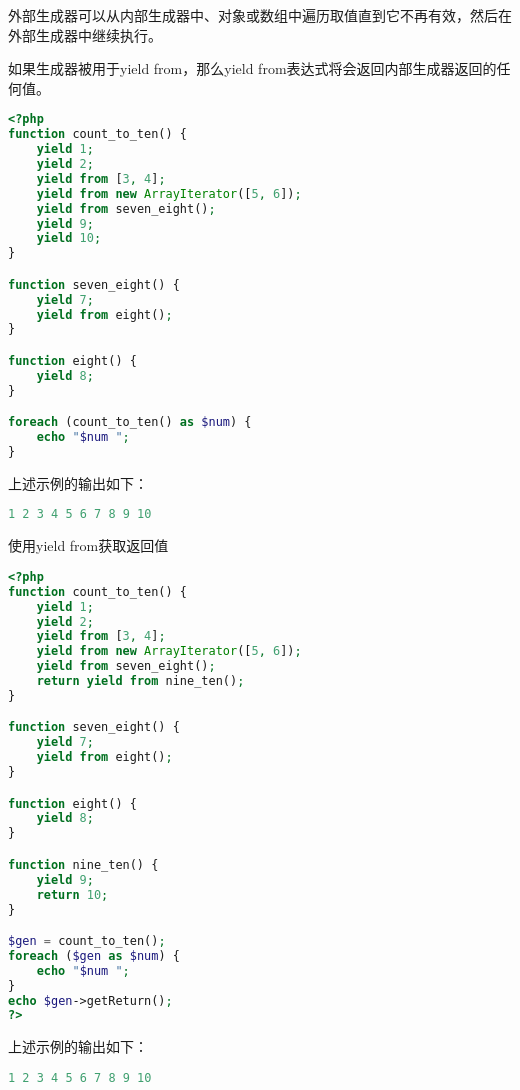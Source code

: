 外部生成器可以从内部生成器中、对象或数组中遍历取值直到它不再有效，然后在外部生成器中继续执行。

如果生成器被用于yield from，那么yield from表达式将会返回内部生成器返回的任何值。


\begin{lstlisting}[language=PHP]
<?php
function count_to_ten() {
    yield 1;
    yield 2;
    yield from [3, 4];
    yield from new ArrayIterator([5, 6]);
    yield from seven_eight();
    yield 9;
    yield 10;
}

function seven_eight() {
    yield 7;
    yield from eight();
}

function eight() {
    yield 8;
}

foreach (count_to_ten() as $num) {
    echo "$num ";
}
\end{lstlisting}

上述示例的输出如下：

\begin{lstlisting}[language=PHP]
1 2 3 4 5 6 7 8 9 10
\end{lstlisting}



\begin{example}
使用yield from获取返回值
\begin{lstlisting}[language=PHP]
<?php
function count_to_ten() {
    yield 1;
    yield 2;
    yield from [3, 4];
    yield from new ArrayIterator([5, 6]);
    yield from seven_eight();
    return yield from nine_ten();
}

function seven_eight() {
    yield 7;
    yield from eight();
}

function eight() {
    yield 8;
}

function nine_ten() {
    yield 9;
    return 10;
}

$gen = count_to_ten();
foreach ($gen as $num) {
    echo "$num ";
}
echo $gen->getReturn();
?>
\end{lstlisting}
\end{example}

上述示例的输出如下：


\begin{lstlisting}[language=PHP]
1 2 3 4 5 6 7 8 9 10
\end{lstlisting}

